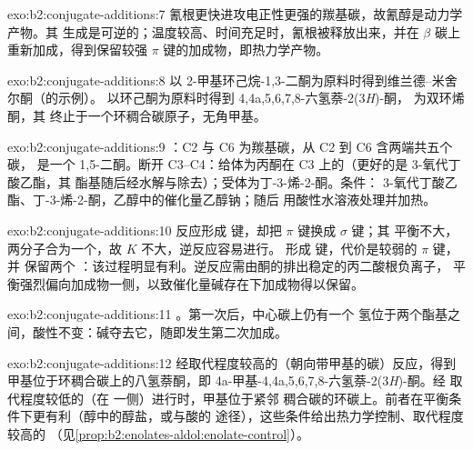 \begin{solution}{exo:b2:conjugate-additions:7}
氰根更快进攻电正性更强的羰基碳，故氰醇是动力学产物。其
生成是可逆的；温度较高、时间充足时，氰根被释放出来，并在
$\beta$ 碳上重新加成，得到保留较强  $\pi$ 键的加成物，即热力学产物。
\end{solution}

\begin{solution}{exo:b2:conjugate-additions:8}
以 2-甲基环己烷-1,3-二酮为原料时得到维兰德–米舍尔酮（的示例）。
以环己酮为原料时得到 4,4a,5,6,7,8-六氢萘-2(3\textit{H})-酮，
为双环烯酮，其  终止于一个环稠合碳原子，无角甲基。
\end{solution}

\begin{solution}{exo:b2:conjugate-additions:9}
：C2 与 C6 为羰基碳，从 C2 到 C6 含两端共五个碳，
是一个 1,5-二酮。断开 C3--C4：给体为丙酮在 C3 上的（更好的是 3-氧代丁酸乙酯，其
酯基随后经水解与除去）；受体为丁-3-烯-2-酮。条件：
3-氧代丁酸乙酯、丁-3-烯-2-酮，乙醇中的催化量乙醇钠；随后
用酸性水溶液处理并加热。
\end{solution}

\begin{solution}{exo:b2:conjugate-additions:10}
反应形成  键，却把  $\pi$ 键换成  $\sigma$ 键；其
平衡不大，两分子合为一个，故 $K$ 不大，逆反应容易进行。
形成  键，代价是较弱的  $\pi$ 键，并
保留两个 ：该过程明显有利。逆反应需由酮的排出稳定的丙二酸根负离子，
平衡强烈偏向加成物一侧，以致催化量碱存在下加成物得以保留。
\end{solution}

\begin{solution}{exo:b2:conjugate-additions:11}
。第一次后，中心碳上仍有一个
氢位于两个酯基之间，酸性不变：碱夺去它，随即发生第二次加成。
\end{solution}

\begin{solution}{exo:b2:conjugate-additions:12}
经取代程度较高的（朝向带甲基的碳）反应，得到
甲基位于环稠合碳上的八氢萘酮，即 4a-甲基-4,4a,5,6,7,8-六氢萘-2(3\textit{H})-酮。经
取代程度较低的（在  一侧）进行时，甲基位于紧邻
稠合碳的环碳上。前者在平衡条件下更有利（醇中的醇盐，或与酸的
途径），这些条件给出热力学控制、取代程度较高的
（见\cref{prop:b2:enolates-aldol:enolate-control}）。
\end{solution}

